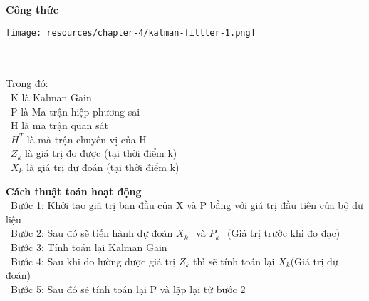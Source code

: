 \textbf{Công thức}

\begin{minipage}{0.45\textwidth}
\centering
\texttt{[image: resources/chapter-4/kalman-fillter-1.png]}
\end{minipage}
\\ \\
Trong đó:\\
    \indent\textbullet\ K là Kalman Gain\\
    \indent\textbullet\ P là Ma trận hiệp phương sai\\
    \indent\textbullet\ H là ma trận quan sát \\
    \indent\textbullet\ \(H^T\) là mà trận chuyên vị của H\\
    \indent\textbullet\ \(Z_k\) là giá trị đo được (tại thời điểm k)\\
    \indent\textbullet\ \(X_k\) là giá trị dự đoán (tại thời điểm k)

\textbf{Cách thuật toán hoạt động}\\
    \indent\textbullet\ Bước 1: Khởi tạo giá trị ban đầu của X và P bằng với giá trị đầu tiên của bộ dữ liệu\\
    \indent\textbullet\ Bước 2: Sau đó sẽ tiến hành dự đoán \(X_{k^-}\) và \(P_{k^-}\) (Giá trị trước khi đo đạc)\\
    \indent\textbullet\ Bước 3: Tính toán lại Kalman Gain\\
    \indent\textbullet\ Bước 4: Sau khi đo lường được giá trị \(Z_k\) thì sẽ tính toán lại \(X_k\)(Giá trị dự đoán)\\
    \indent\textbullet\ Bước 5: Sau đó sẽ tính toán lại P và lặp lại từ bước 2\\


